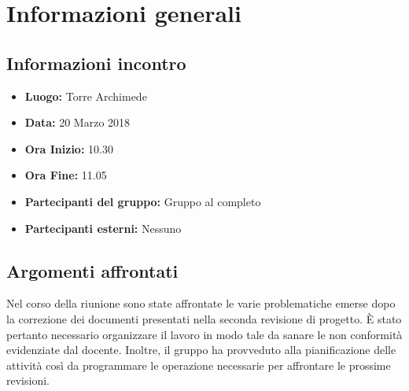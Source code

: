 \documentclass[a4paper, oneside, openany]{article}
\begin{document}
	\section{Informazioni generali}
		\subsection{Informazioni incontro}
			\begin{itemize}
				\item { \textbf{Luogo:} Torre Archimede }
				\item { \textbf{Data:} 20 Marzo 2018 }
				\item { \textbf{Ora Inizio:} 10.30 }
					\item { \textbf{Ora Fine:} 11.05 }
				\item { \textbf{Partecipanti del gruppo:} Gruppo al completo }
				\item { \textbf{Partecipanti esterni:} Nessuno }
			\end{itemize}
		
	
	\subsection{Argomenti affrontati}
    Nel corso della riunione sono state affrontate le varie problematiche emerse dopo la correzione dei documenti presentati nella seconda revisione di progetto. È stato pertanto necessario organizzare il lavoro in modo tale da sanare le non conformità evidenziate dal docente. 
    Inoltre, il gruppo ha provveduto alla pianificazione delle attività così da programmare le operazione necessarie per affrontare le prossime revisioni.
    
\end{document}
